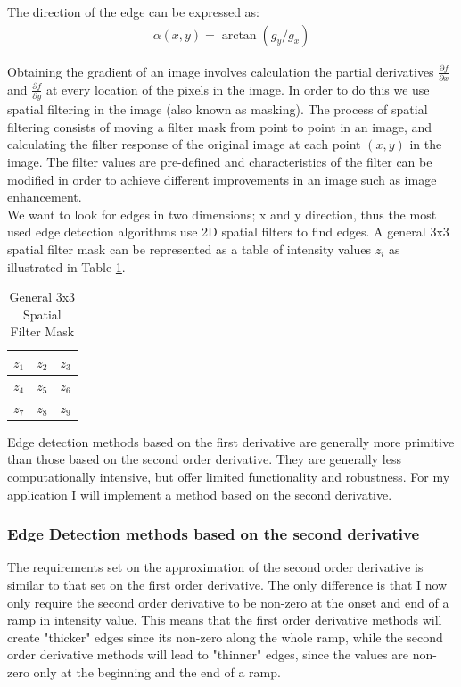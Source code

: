 The direction of the edge can be expressed as:
\begin{align}
\alpha(x,y) = \arctan(g_y/g_x)
\label{eq:direction}
\end{align}

Obtaining the gradient of an image involves calculation the partial derivatives $\frac{\partial f}{\partial x}$ and $\frac{\partial f}{\partial y}$ at every location of the pixels in the image. In order to do this we use spatial filtering in the image (also known as masking). The process of spatial filtering consists of moving a filter mask from point to point in an image, and calculating the filter response of the original image at each point $(x,y)$ in the image. The filter values are pre-defined and characteristics of the filter can be modified in order to achieve different improvements in an image such as image enhancement.\\

We want to look for edges in two dimensions; x and y direction, thus the most used edge detection algorithms use 2D spatial filters to find edges. A general 3x3 spatial filter mask can be represented as a table of intensity values $z_i$ as illustrated in Table \ref{spatial}.
\begin{table}[h]
\centering
\caption{General 3x3 Spatial Filter Mask}
\label{spatial}
\begin{tabular}{|l|l|l|}
\hline
$z_1$ & $z_2$ & $z_3$\\ \hline
$z_4$ & $z_5$ & $z_6$\\ \hline
$z_7$ & $z_8$ & $z_9$\\ \hline
\end{tabular}
\end{table}

Edge detection methods based on the first derivative are generally more primitive than those based on the second order derivative. They are generally less computationally intensive, but offer limited functionality and robustness. For my application I will implement a method based on the second derivative.

\subsubsection{Edge Detection methods based on the second derivative}
The requirements set on the approximation of the second order derivative is similar to that set on the first order derivative. The only difference is that I now only require the second order derivative to be non-zero at the onset and end of a ramp in intensity value. This means that the first order derivative methods will create "thicker" edges since its non-zero along the whole ramp, while the second order derivative methods will lead to "thinner" edges, since the values are non-zero only at the beginning and the end of a ramp.



